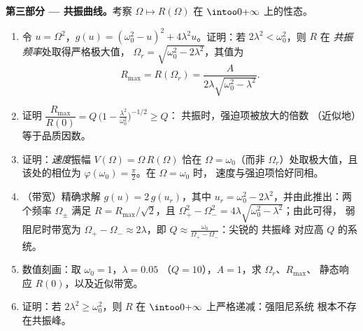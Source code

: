 \begin{problem}
\medskip
\noindent\textbf{第三部分 --- 共振曲线。}考察
$\Omega \mapsto R(\Omega)$ 在 $\intoo0{+\infty}$ 上的性态。
\begin{enumerate}[resume]
  \item 令 $u = \Omega^2$，$g(u) = (\omega_0^2 - u)^2 +
        4\lambda^2 u$。证明：若 $2\lambda^2 < \omega_0^2$，则 $R$ 在
        \emph{共振频率}处取得严格极大值，
        $\Omega_r = \sqrt{\omega_0^2 - 2\lambda^2}$，其值为
        \[
        R_{\max} = R(\Omega_r)
        = \frac{A}{2\lambda\sqrt{\omega_0^2 - \lambda^2}} .
        \]
  \item 证明 $\dfrac{R_{\max}}{R(0)} = Q\,\bigl(1 -
        \tfrac{\lambda^2}{\omega_0^2}\bigr)^{-1/2} \geq Q$：
        共振时，强迫项被放大的倍数
        （近似地）等于品质因数。
  \item 证明：\emph{速度}振幅 $V(\Omega) =
        \Omega\,R(\Omega)$ 恰在 $\Omega =
        \omega_0$（而非 $\Omega_r$）处取极大值，且该处的相位为
        $\varphi(\omega_0) = \frac\pi2$。在 $\Omega = \omega_0$ 时，
        速度与强迫项恰好同相。
  \item （带宽）精确求解 $g(u) = 2\,g(u_r)$，其中 $u_r =
        \omega_0^2 - 2\lambda^2$，并由此推出：两个频率 $\Omega_\pm$ 满足
        $R = R_{\max}/\sqrt2$，且 $\Omega_+^2 - \Omega_-^2 =
        4\lambda\sqrt{\omega_0^2 - \lambda^2}$；由此可得，
        弱阻尼时带宽为 $\Omega_+ - \Omega_-
        \approx 2\lambda$，即 $Q \approx
        \frac{\omega_0}{\Omega_+ - \Omega_-}$：尖锐的
        共振峰
        对应高 $Q$ 的系统。
  \item 数值刻画：取 $\omega_0 = 1$，$\lambda = 0.05$
        （$Q = 10$），$A = 1$，求 $\Omega_r$、$R_{\max}$、
        静态响应 $R(0)$，以及近似带宽。
  \item 证明：若 $2\lambda^2 \geq \omega_0^2$，则 $R$ 在
        $\intoo0{+\infty}$ 上严格递减：强阻尼系统
        根本不存在共振峰。
\end{enumerate}


\end{problem}
